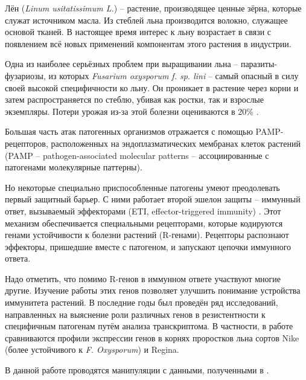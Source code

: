 Лён (\textit{Linum usitatissimum L.}) -- растение, производящее ценные зёрна, которые служат источником масла.
Из стеблей льна производится волокно, служащее основой тканей.
В настоящее время интерес к льну возрастает в связи с появлением всё новых применений компонентам этого растения в индустрии.

Одна из наиболее серьёзных проблем при выращивании льна -- паразиты-фузариозы, из которых \textit{Fusarium oxysporum f. sp. lini} -- самый опасный в силу своей высокой специфичности ко льну.
Он проникает в растение через корни и затем распространяется по стеблю, убивая как ростки, так и взрослые экземпляры.
Потери урожая из-за этой болезни оцениваются в $ 20 \% $ \cite{planchon2021}.

Большая часть атак патогенных организмов отражается с помощью PAMP-рецепторов, расположенных на эндоплазматических мембранах клеток растений \cite{boba2018} (PAMP -- pathogen-associated molecular patterns -- ассоциированные с патогенами молекулярные паттерны).

Но некоторые специально приспособленные патогены умеют преодолевать первый защитный барьер.
С ними работает второй эшелон защиты -- иммунный ответ, вызываемый эффекторами (ETI, effector-triggered immunity) \cite{tyagi2021}.
Этот механизм обеспечивается специальными рецепторами, которые кодируются генами устойчивости к болезни растений (R-генами).
Рецепторы распознают эффекторы, пришедшие вместе с патогеном, и запускают цепочки иммунного ответа.

Надо отметить, что помимо R-генов в иммунном ответе участвуют многие другие.
Изучение работы этих генов позволяет улучшить понимание устройства иммунитета растений.
В последние годы был проведён ряд исследований, направленных на выяснение роли различных генов в резистентности к специфичным патогенам путём анализа транскриптома.
В частности, в работе \cite{boba2018} сравниваются профили экспрессии генов в корнях проростков льна сортов Nike (более устойчивого к \textit{F. Oxysporum}) и Regina.

В данной работе проводятся манипуляции с данными, полученными в \cite{boba2018}.
